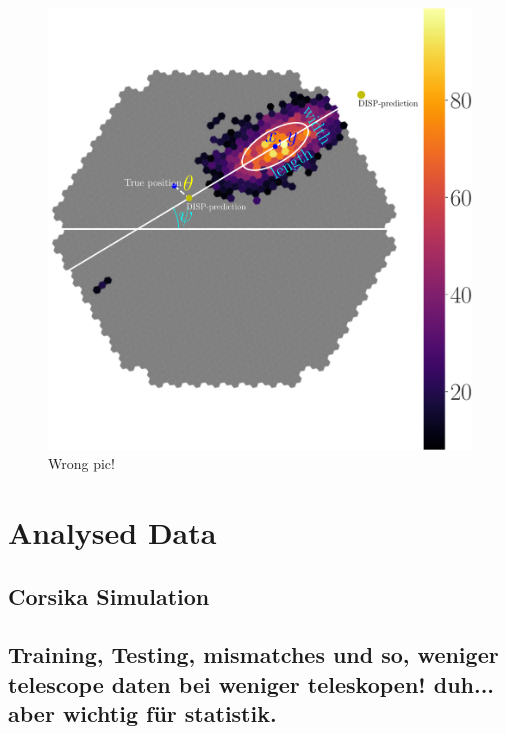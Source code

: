\begin{figure}
    \includegraphics[width=0.9\linewidth]{../Plots/hillas_complete.pdf}
    \caption{Wrong pic!}
    \label{fig:disp_amb}
\end{figure}


\section{Analysed Data}
\subsection{Corsika Simulation}
\subsection{Training, Testing, mismatches und so, weniger telescope daten bei weniger teleskopen! duh... aber wichtig für statistik.}
